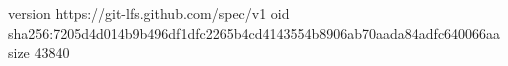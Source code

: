 version https://git-lfs.github.com/spec/v1
oid sha256:7205d4d014b9b496df1dfc2265b4cd4143554b8906ab70aada84adfc640066aa
size 43840
